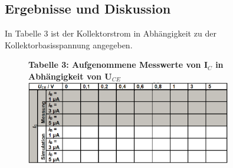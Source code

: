 \subsection{Ergebnisse und Diskussion}
In Tabelle 3 ist der Kollektorstrom in Abh\"angigkeit zu der Kollektorbasisspannung angegeben. 
\begin{figure}[!h]
\begin{center}
\textbf{Tabelle 3: Aufgenommene Messwerte von I$_C$ in Abh\"angigkeit von U$_{CE}$  } \\[0.2cm]
\includegraphics[width=0.8\textwidth]{ergebnissVersuch3}
\end{center}
\end{figure}
